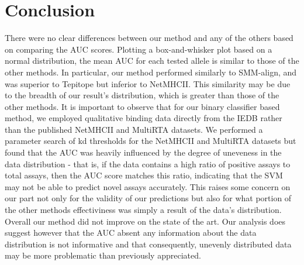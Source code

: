 \documentclass[journal]{IEEEtran}
\begin{document}
\section{Conclusion}
There were no clear differences between our method and any of the others based on comparing the AUC scores. Plotting a box-and-whisker plot based on a normal distribution, the mean AUC for each tested allele is similar to those of the other methods. In particular, our method  performed similarly to SMM-align, and was superior to Tepitope but inferior to NetMHCII. This similarity may be due to the breadth of our result's distribution, which is greater than those of the other methods. It is important to observe that for our binary classifier based method, we employed qualitative binding data directly from the IEDB rather than the published NetMHCII and MultiRTA datasets.  We performed a parameter search of kd thresholds for the NetMHCII and MultiRTA datasets but found that the AUC was heavily influenced by the degree of uneveness in the data distribution - that is, if the data contains a high ratio of positive assays to total assays, then the AUC score matches this ratio, indicating that the SVM may not be able to predict novel assays accurately. This raises some concern on our part not only for the validity of our predictions but also for what portion of the other methods effectiviness was simply a result of the data's distribution.  Overall our method did not improve on the state of the art.  Our analysis does suggest however that the AUC absent any information about the data distribution is not informative and that consequently, unevenly distributed data may be more problematic than previously appreciated.






%
\end{document}
